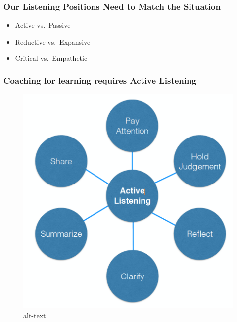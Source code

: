 \documentclass[
]{book}
\providecommand{\tightlist}{%
  \setlength{\itemsep}{0pt}\setlength{\parskip}{0pt}}
\begin{document}
\hypertarget{our-listening-positions-need-to-match-the-situation}{%
\subsubsection*{Our Listening Positions Need to Match the Situation}\label{our-listening-positions-need-to-match-the-situation}}

\begin{itemize}
\tightlist
\item
  Active vs.~Passive
\item
  Reductive vs.~Expansive
\item
  Critical vs.~Empathetic
\end{itemize}

\hypertarget{coaching-for-learning-requires-active-listening}{%
\subsubsection*{Coaching for learning requires Active Listening}\label{coaching-for-learning-requires-active-listening}}

\begin{figure}
\centering
\includegraphics{assets/presentations/coaching/active.png}
\caption{alt-text}
\end{figure}
\end{document}
